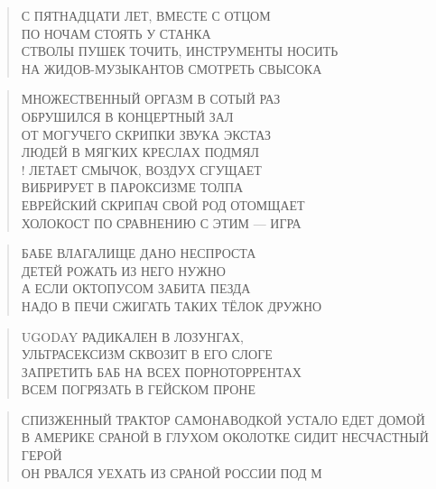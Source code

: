 \poemtitle{***}
\begin{verse}
С ПЯТНАДЦАТИ ЛЕТ, ВМЕСТЕ С ОТЦОМ\\
ПО НОЧАМ СТОЯТЬ У СТАНКА\\
СТВОЛЫ ПУШЕК ТОЧИТЬ, ИНСТРУМЕНТЫ НОСИТЬ\\
НА ЖИДОВ-МУЗЫКАНТОВ СМОТРЕТЬ СВЫСОКА
\end{verse}

\poemtitle{***}
\begin{verse}
МНОЖЕСТВЕННЫЙ ОРГАЗМ В СОТЫЙ РАЗ\\
ОБРУШИЛСЯ В КОНЦЕРТНЫЙ ЗАЛ\\
ОТ МОГУЧЕГО СКРИПКИ ЗВУКА ЭКСТАЗ\\
ЛЮДЕЙ В МЯГКИХ КРЕСЛАХ ПОДМЯЛ\\!
ЛЕТАЕТ СМЫЧОК, ВОЗДУХ СГУЩАЕТ\\
ВИБРИРУЕТ В ПАРОКСИЗМЕ ТОЛПА\\
ЕВРЕЙСКИЙ СКРИПАЧ СВОЙ РОД ОТОМЩАЕТ\\
ХОЛОКОСТ ПО СРАВНЕНИЮ С ЭТИМ — ИГРА
\end{verse}

\poemtitle{***}
\begin{verse}
БАБЕ ВЛАГАЛИЩЕ ДАНО НЕСПРОСТА\\
ДЕТЕЙ РОЖАТЬ ИЗ НЕГО НУЖНО\\
А ЕСЛИ ОКТОПУСОМ ЗАБИТА ПЕЗДА\\
НАДО В ПЕЧИ СЖИГАТЬ ТАКИХ ТЁЛОК ДРУЖНО
\end{verse}

\poemtitle{***}
\begin{verse}
UGODAY РАДИКАЛЕН В ЛОЗУНГАХ,\\
УЛЬТРАСЕКСИЗМ СКВОЗИТ В ЕГО СЛОГЕ\\
ЗАПРЕТИТЬ БАБ НА ВСЕХ ПОРНОТОРРЕНТАХ\\
ВСЕМ ПОГРЯЗАТЬ В ГЕЙСКОМ ПРОНЕ
\end{verse}

\poemtitle{***}
\begin{verse}
СПИЗЖЕННЫЙ ТРАКТОР САМОНАВОДКОЙ УСТАЛО ЕДЕТ ДОМОЙ\\
В АМЕРИКЕ СРАНОЙ В ГЛУХОМ ОКОЛОТКЕ СИДИТ НЕСЧАСТНЫЙ ГЕРОЙ\\
ОН РВАЛСЯ УЕХАТЬ ИЗ СРАНОЙ РОССИИ ПОД М
\end{verse}

